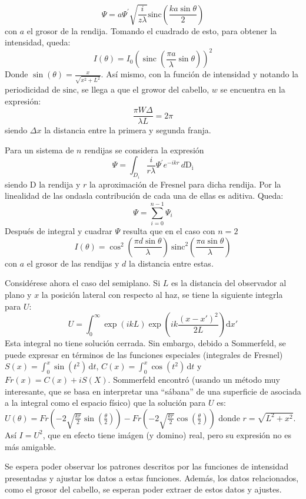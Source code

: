 \documentclass[12p]{article}
\begin{document}
$$ \Psi = a \Psi^{\prime} \sqrt{\frac{i}{z\lambda}} \mathrm{sinc} \left( \frac{ka\sin\theta}{2} \right) $$
con $a$ el grosor de la rendija. Tomando el cuadrado de esto, para obtener la intensidad, queda:
$$I(\theta) = I_0 {\left( \operatorname{sinc} \left( \frac{\pi a}{\lambda} \sin \theta \right) \right) }^2$$
Donde $\sin(\theta) = \frac{x}{\sqrt{x^2 + L^2}}$. Así mismo, con la función de intensidad y notando la periodicidad de $\mathrm{sinc}$, se llega a que el growor del cabello, $w$ se encuentra en la expresión:
$$\frac{\pi W \Delta}{\lambda L} = 2\pi$$
siendo $\Delta x$ la distancia entre la primera y segunda franja.
\par Para un sistema de $n$ rendijas se considera la expresión
$$\Psi = \int_{D_i} \frac{i}{r\lambda} \Psi^\prime e^{-ikr}\,d\mathrm{D_i}$$
siendo D la rendija y $r$ la aproximación de Fresnel para dicha rendija. Por la linealidad de las ondasla contribución de cada una de ellas es aditiva. Queda:
$$\Psi = \sum_{i=0}^{n-1}\Psi_i$$
Después de integral y cuadrar $\Psi$ resulta que en el caso con $n = 2$
$$I(\theta) = \cos^2 \left ({\frac {\pi d \sin \theta}{\lambda}}\right)~\mathrm{sinc}^2 \left ( \frac {\pi a \sin \theta}{\lambda} \right)$$
con $a$ el grosor de las rendijas y $d$ la distancia entre estas.
\par Considérese ahora el caso del semiplano. Si $L$ es la distancia del observador al plano  y $x$ la posición lateral con respecto al haz,  se tiene la siguiente integrla para $U$:
$$U = \int_0^{\infty}\exp(ikL)\exp\left (ik\frac{(x-x')^2}{2L} \right ) \mathrm{d}x'$$
Esta integral no tiene solución cerrada. Sin embargo, debido a Sommerfeld, se puede expresar en términos de las funciones especiales (integrales de Fresnel) $S(x) = \int_0^x \sin(t^2)\,\mathrm{d}t$, $C(x) = \int_0^x \cos(t^2)\,\mathrm{d}t$ y $Fr(x) = C(x) + iS(X)$. Sommerfeld encontró (usando un método muy interesante, que se basa en interpretar una ``sábana'' de una superficie de asociada a la integral como el espacio físico) que la solución para $U$ es:
$U(\theta) = Fr\left(-2\sqrt{\frac{kr}{2}} \sin(\frac{\theta}{2}) \right) - Fr\left(-2\sqrt{\frac{kr}{2}} \cos(\frac{\theta}{2}) \right)$
donde $r = \sqrt{L^2 + x^2}$. Así $I = U^2$, que en efecto tiene imágen (y domino) real, pero su expresión no es más amigable.
\par Se espera poder observar los patrones descritos por las funciones de intensidad presentadas y ajustar los datos a estas funciones. Además, los datos relacionados, como el grosor del cabello, se esperan poder extraer de estos datos y ajustes.
 
\end{document}
